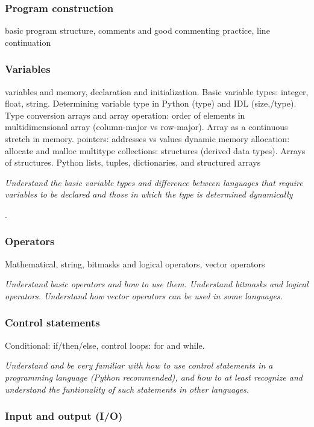 \documentclass{article}
\newcommand{\test}[1]{%
    \begin{center}
        \colorbox{hl}{\parbox{0.9\textwidth}{\emph{#1}}}
    \end{center}}
\begin{document}
\subsubsection{Program construction}
basic program structure,
comments and good commenting practice,
line continuation
\subsubsection{Variables}
variables and memory, declaration and initialization.
Basic variable types: integer, float, string. Determining variable
type in Python (type) and IDL (size,/type).
Type conversion
arrays and array operation: order of elements in multidimensional
array (column-major vs row-major). Array as a continuous stretch in
memory.
pointers: addresses vs values
dynamic memory allocation: allocate and malloc
multitype collections: structures (derived data types). Arrays of
structures. Python lists, tuples, dictionaries, and structured arrays

\test{Understand the basic variable types and difference between
languages that require variables to be declared and those in which the
type is determined dynamically}.

\subsubsection{Operators}
Mathematical, string, bitmasks and logical operators, vector operators
\test{Understand basic operators and how to use them. Understand
bitmasks and logical operators. Understand how vector operators can be
used in some languages.}
\subsubsection{Control statements}
Conditional: if/then/else, control loops: for and while.

\test{Understand and be very familiar with how to use control
statements in a programming language (Python recommended),
and how to at least recognize and understand the funtionality
of such statements in other languages.}
\subsubsection{Input and output (I/O)}
\end{document}
